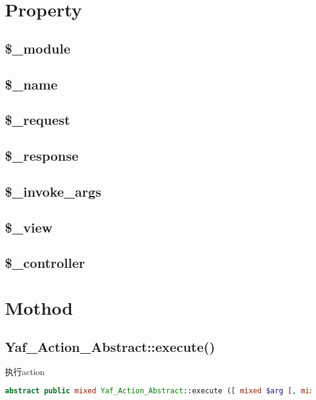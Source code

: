 \section{Property}


\subsection{\$\_module}


\subsection{\$\_name}


\subsection{\$\_request}


\subsection{\$\_response}


\subsection{\$\_invoke\_args}


\subsection{\$\_view}



\subsection{\$\_controller}


\section{Mothod}


\subsection{Yaf\_Action\_Abstract::execute()}


执行action







\begin{lstlisting}[language=PHP]
abstract public mixed Yaf_Action_Abstract::execute ([ mixed $arg [, mixed $... ]] )
\end{lstlisting}

